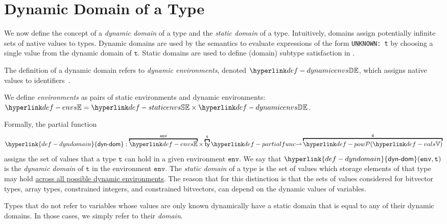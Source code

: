 \documentclass{book}
\newcommand\env[0]{\texttt{env}}
\newcommand\dynamicdomain[0]{\hyperlink{def-dyndomain}{\textsf{dyn-dom}}}
\newcommand\vt[0]{\texttt{t}}
\begin{document}
\section{Dynamic Domain of a Type}
\hypertarget{def-dyndomain}{}

We now define the concept of a \emph{dynamic domain} of a type
and the \emph{static domain} of a type.
Intuitively, domains assign potentially infinite sets of native values to types.
Dynamic domains are used by the semantics to evaluate expressions of the form \texttt{UNKNOWN: t}
by choosing a single value from the dynamic domain of $\vt$.
Static domains are used to define (domain) subtype satisfaction in .

\hypertarget{def-dynamicenvs}{}
The definition of a dynamic domain refers to \emph{dynamic environments}, denoted $\dynamicenvs$,
which assigns native values to identifiers~\cite{ASLSemanticsReference}.

\hypertarget{def-envs}{}
We define \emph{environments} as pairs of static environments and dynamic environments:
$\envs = \staticenvs \times \dynamicenvs$.

Formally, the partial function
\[
  \dynamicdomain : \overname{\envs}{\env} \times \overname{\ty}{\vt}
  \partialto \overname{\pow{\vals}}{\vd}
\]
assigns the set of values that a type $\vt$ can hold in a given environment $\env$.
%
We say that $\dynamicdomain(\env, \vt)$ is the \emph{dynamic domain} of $\vt$
in the environment $\env$.
%
The \emph{static domain} of a type is the set of values which storage elements of that type may hold
\underline{across all possible dynamic environments}.
%
The reason that for this distinction is that the sets of values
considered for bitvector types, array types, constrained integers, and constrained bitvectors,
can depend on the dynamic values of variables.

Types that do not refer to variables whose values are only known dynamically have
a static domain that is equal to any of their dynamic domains.
In those cases, we simply refer to their \emph{domain}.
\end{document}
